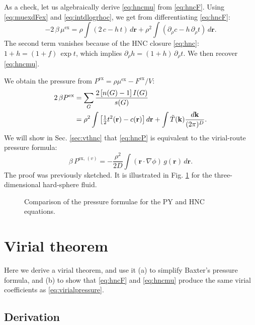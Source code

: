 \documentclass[preprint]{revtex4-1}
\newcommand{\vct}[1]{\mathbf{#1}}
\providecommand{\vr}{} %
\renewcommand{\vr}{\vct{r}}
\newcommand{\vk}{\vct{k}}
\newcommand{\dvk}{\frac{d\vk}{(2\pi)^D}}
\newcommand{\supex}[1]{ { { #1 }^{ \mathrm{ex} } } }
\newcommand{\supexv}[1]{ { { #1 }^{ \mathrm{ex}, \, (v) } } }
\newcommand{\Pex}{\supex{P}}
\newcommand{\Pexv}{\supexv{P}}
\newcommand{\Fex}{\supex{F}}
\newcommand{\muex}{\supex{\mu}}
\begin{document}
As a check, let us algebraically derive \eqref{eq:hncmu} from \eqref{eq:hncF}.
%
Using \eqref{eq:muexdFex} and \eqref{eq:intdlogrhoc},
we get from differentiating \eqref{eq:hncF}:
\[
  -2 \, \beta \, \muex = \rho \int (2\,c - h \, t) \, d\vr
  + \rho^2 \int (\partial_\rho c - h \, \partial_\rho t) \, d\vr.
\]
The second term vanishes because of the HNC closure \eqref{eq:hnc}:
$1+h = (1+f) \, \exp t$,
%
  which implies $\partial_\rho h = (1+ h) \, \partial_\rho t$.
%
We then recover \eqref{eq:hncmu}.



We obtain the pressure from
  $\Pex = \rho \muex - \Fex/V$:
%
\begin{align}
2 \, \beta \Pex
&=
\sum_G \frac{ 2 \, [n(G) - 1] \, I(G) } { s(G) }
\notag \\
&=
\rho^2 \int
  \left[
    \tfrac{1}{2} t^2(\vr) - c(\vr)
  \right] d\vr
  +\int \tilde T(\vk) \dvk.
\label{eq:hncP}
\end{align}
%
We will show in Sec. \ref{sec:vthnc} that
\eqref{eq:hncP}
is equivalent to the virial-route pressure formula:
\begin{equation}
  \beta \, \Pexv
=
  - \frac{\rho^2}{2D}
  \int (\vr \cdot \nabla\phi) \, g(\vr) \, d\vr.
\label{eq:virialpressure}
\end{equation}
%
The proof was previously sketched\cite{morita1960, morita1960I}.
It is illustrated in Fig. \ref{fig:iepres}
for the three-dimensional hard-sphere fluid.

\begin{figure}[h]
  \caption{\label{fig:iepres}
  Comparison of the pressure formulae for the PY and HNC equations.}
\end{figure}





\section{\label{sec:virialtheorem}Virial theorem}

Here we derive a virial theorem,
and use it
(a) to simplify Baxter's pressure formula,
and
(b) to show that \eqref{eq:hncF} and \eqref{eq:hncmu}
produce the same virial coefficients as \eqref{eq:virialpressure}.



\subsection{Derivation}
\end{document}
